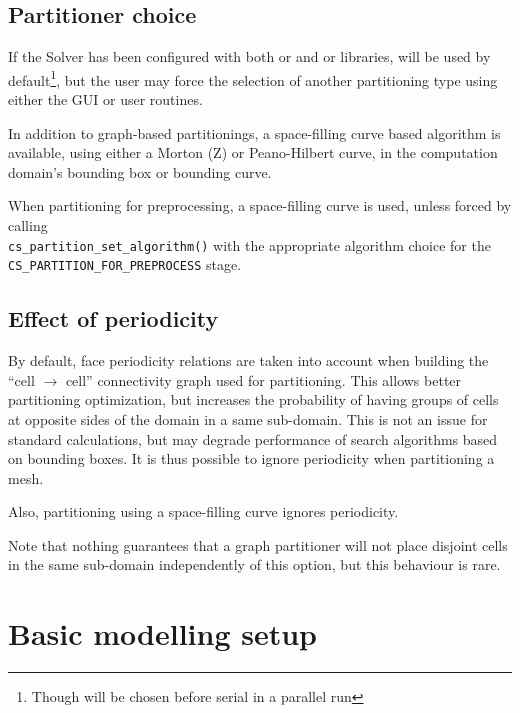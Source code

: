 {{{\subsection{Partitioner choice\label{sec:parall:part:partlib}}

If the Solver has been configured with both \ptscotch or \scotch and
\parmetis or \metis libraries, \ptscotch will be used by default\footnote{
Though \parmetis will be chosen before serial \scotch in a parallel
run}, but the user may force the selection of another partitioning
type using either the GUI or user routines.

In addition to graph-based partitionings, a space-filling curve based
algorithm is available, using either a Morton (Z) or Peano-Hilbert
curve, in the computation domain's bounding box or bounding curve.

When partitioning for preprocessing, a space-filling curve is used,
unless forced by calling\\ \texttt{cs\_partition\_set\_algorithm()}
with the appropriate algorithm choice for the\\
\texttt{CS\_PARTITION\_FOR\_PREPROCESS} stage.

\subsection{Effect of periodicity\label{sec:parall:part:noperiod}}

By default, face periodicity relations are taken into account when building
the ``cell $\rightarrow$ cell'' connectivity graph used for partitioning.
This allows better partitioning optimization, but increases the probability
of having groups of cells at opposite sides of the domain in a same
sub-domain. This is not an issue for standard calculations, but may
degrade performance of search algorithms based on bounding boxes.
It is thus possible to ignore periodicity when partitioning a mesh.

Also, partitioning using a space-filling curve ignores periodicity.

Note that nothing guarantees that a graph partitioner will not place
disjoint cells in the same sub-domain independently of this option,
but this behaviour is rare.

\section{Basic modelling setup}

}}}

